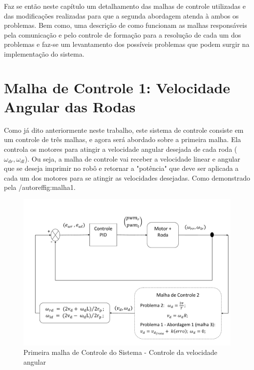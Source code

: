 Faz se então neste capítulo um detalhamento das malhas de controle utilizadas e das modificações realizadas para que a segunda abordagem atenda à ambos os problemas. Bem como, uma descrição de como funcionam as malhas responsáveis pela comunicação e pelo controle de formação para a resolução de cada um dos problemas e faz-se um levantamento dos possíveis problemas que podem surgir na implementação do sistema.   

\section{Malha de Controle 1: Velocidade Angular das Rodas}
\label{sec:malha1 } 
Como já dito anteriormente neste trabalho, este sistema de controle consiste em um controle de três malhas, e agora será abordado sobre a primeira malha. Ela controla os motores para atingir a velocidade angular desejada de cada roda ($\omega_{dr},\omega_{dl}$). Ou seja, a malha de controle vai receber a velocidade linear e angular que se deseja imprimir no robô e retornar a "potência" que deve ser aplicada a cada um dos motores para se atingir as velocidades desejadas. Como demonstrado pela /autoref{fig:malha1}.

\begin{figure}[!htb]
	\centering
	\includegraphics[width=1.0\textwidth]{./04-figuras/malha1}
	\caption{Primeira malha de Controle do Sistema - Controle da velocidade angular}
	\label{fig:malha1}
\end{figure}

